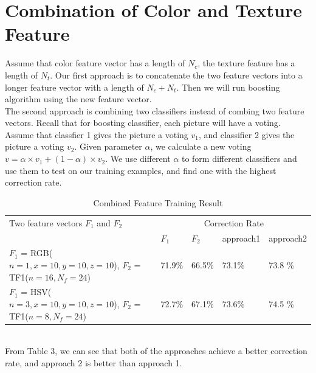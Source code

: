 \documentclass[12pt]{article}
\begin{document}
\section {Combination of Color and Texture Feature}
Assume that color feature vector has a length of $N_c$, the texture feature has a length of $N_t$. Our first approach is to concatenate the two feature vectors into a longer feature vector with a length of $N_c + N_t$. Then we will run boosting algorithm using the new feature vector. \\
The second approach is combining two classifiers instead of combing two feature vectors. Recall that for boosting classifier, each picture will have a voting. Assume that classfier 1 gives the picture a voting $v_1$, and classifier 2 gives the picture a voting $v_2$. Given parameter $\alpha$, we calculate a new voting $ v = \alpha \times v_1 + (1-\alpha) \times v_2$. We use different $\alpha$ to form different classifiers and use them to test on our training examples, and find one with the highest correction rate.
\begin{table}[h]
\caption{Combined Feature Training Result}
\centering
\begin{tabular}{| p{8cm}| l | l | l | l |}
\hline
Two feature vectors $F_1$ and $F_2$ & \multicolumn{4}{|c|}{Correction Rate} \\ \cline{2-5}
 & $F_1$ & $F_2$ & approach1 & approach2 \\
\hline
$F_1$ = RGB($n=1,x=10,y=10,z=10$), $F_2$ = TF1($n=16,N_f=24$) & 71.9\% & 66.5\% & 73.1\% & 73.8 \% \\
\hline
$F_1$ = HSV($n=3,x=10,y=10,z=10$), $F_2$ = TF1($n=8,N_f=24$) & 72.7\% & 67.1\% & 73.6\% & 74.5 \% \\
\hline
\end{tabular}
\end{table}\\
From Table 3, we can see that both of the approaches achieve a better correction rate, and approach 2 is better than approach 1. 
\end{document}
